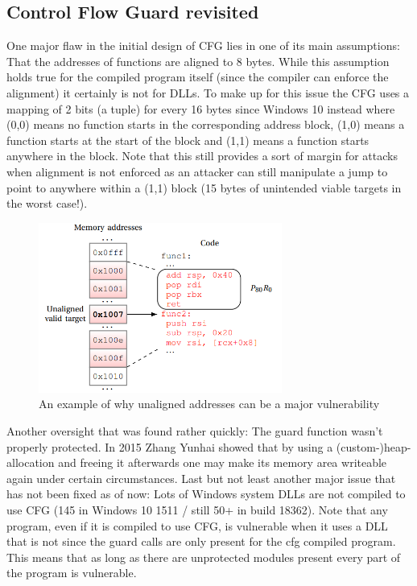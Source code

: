 \documentclass[10pt,twocolumn,a4paper]{article}
\begin{document}
\subsection{Control Flow Guard revisited}
One major flaw in the initial design of CFG lies in one of its main assumptions: That the addresses of functions are aligned to 8 bytes.
While this assumption holds true for the compiled program itself (since the compiler can enforce the alignment) it certainly is not for DLLs.
To make up for this issue the CFG uses a mapping of 2 bits (a tuple) for every 16 bytes since Windows 10 instead where (0,0) means no function starts in the corresponding address block, (1,0) means a function starts at the start of the block and (1,1) means a function starts anywhere in the block.
Note that this still provides a sort of margin for attacks when alignment is not enforced as an attacker can still manipulate a jump to point to anywhere within a (1,1) block (15 bytes of unintended viable targets in the worst case!).
\begin{figure}[h]
	\includegraphics[keepaspectratio,width=8cm]{fig/cfgunallignedcode}
	\caption{An example of why unaligned addresses can be a major vulnerability\cite{cfgexplore}}
\end{figure}
\newpage
Another oversight that was found rather quickly: The guard function wasn't properly protected.
In 2015 Zhang Yunhai showed that by using a \newline(custom-)heap-allocation and freeing it afterwards one may make its memory area writeable again under certain circumstances.\cite{cfgbypass}
\newline Last but not least another major issue that has not been fixed as of now:
Lots of Windows system DLLs are not compiled to use CFG (145 in Windows 10 1511 / still 50+ in build 18362).\cite{cfgbypass2}
\newline Note that any program, even if it is compiled to use CFG, is vulnerable when it uses a DLL that is not since the guard calls are only present for the cfg compiled program.
This means that as long as there are unprotected modules present every part of the program is vulnerable.
\end{document}
